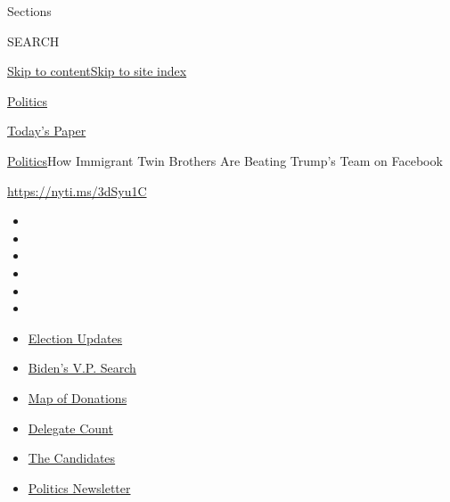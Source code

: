 Sections

SEARCH

\protect\hyperlink{site-content}{Skip to
content}\protect\hyperlink{site-index}{Skip to site index}

\href{https://www.nytimes.com/section/politics}{Politics}

\href{https://myaccount.nytimes.com/auth/login?response_type=cookie\&client_id=vi}{}

\href{https://www.nytimes.com/section/todayspaper}{Today's Paper}

\href{/section/politics}{Politics}\textbar{}How Immigrant Twin Brothers
Are Beating Trump's Team on Facebook

\url{https://nyti.ms/3dSyu1C}

\begin{itemize}
\item
\item
\item
\item
\item
\item
\end{itemize}

\begin{itemize}
\item
  \href{https://www.nytimes.com/2020/07/31/us/elections/biden-vs-trump.html?action=click\&pgtype=Article\&state=default\&region=TOP_BANNER\&context=storylines_menu}{Election
  Updates}
\item
  \href{https://www.nytimes.com/article/biden-vice-president-2020.html?action=click\&pgtype=Article\&state=default\&region=TOP_BANNER\&context=storylines_menu}{Biden's
  V.P. Search}
\item
  \href{https://www.nytimes.com/interactive/2020/07/24/us/politics/trump-biden-campaign-donors.html?action=click\&pgtype=Article\&state=default\&region=TOP_BANNER\&context=storylines_menu}{Map
  of Donations}
\item
  \href{https://www.nytimes.com/interactive/2020/us/elections/delegate-count-primary-results.html?action=click\&pgtype=Article\&state=default\&region=TOP_BANNER\&context=storylines_menu}{Delegate
  Count}
\item
  \href{https://www.nytimes.com/interactive/2019/us/politics/2020-presidential-candidates.html?action=click\&pgtype=Article\&state=default\&region=TOP_BANNER\&context=storylines_menu}{The
  Candidates}
\item
  \href{https://www.nytimes.com/newsletters/politics?action=click\&pgtype=Article\&state=default\&region=TOP_BANNER\&context=storylines_menu}{Politics
  Newsletter}
\end{itemize}

